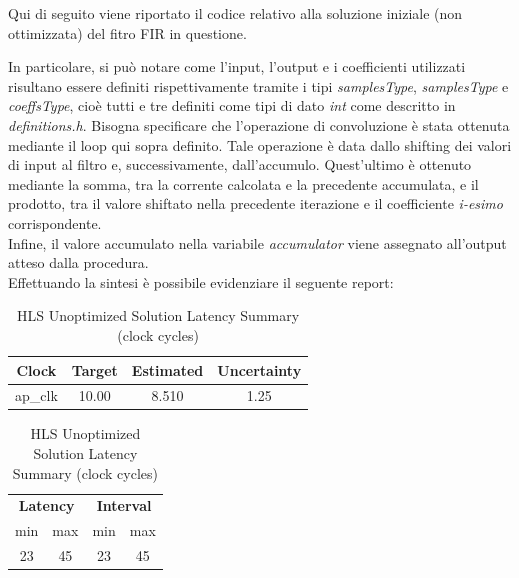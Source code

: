 Qui di seguito viene riportato il codice relativo alla soluzione iniziale (non ottimizzata) del fitro FIR in questione.



In particolare, si può notare come l'input, l'output e i coefficienti utilizzati risultano essere definiti rispettivamente tramite i tipi \textit{samplesType}, \textit{samplesType} e \textit{coeffsType}, cioè tutti e tre definiti come tipi di dato \textit{int} come descritto in \textit{definitions.h}. 
Bisogna specificare che l'operazione di convoluzione è stata ottenuta mediante il loop qui sopra definito. Tale operazione è data dallo shifting dei valori di input al filtro e, successivamente, dall'accumulo. Quest'ultimo è ottenuto mediante la somma, tra la corrente calcolata e la precedente accumulata, e il prodotto, tra il valore shiftato nella precedente iterazione e il coefficiente \textit{i-esimo} corrispondente.\\
Infine, il valore accumulato nella variabile \textit{accumulator} viene assegnato all'output atteso dalla procedura.\\
Effettuando la sintesi è possibile evidenziare il seguente report:\\

\begin{table}[H]
    \centering
    \begin{minipage}[t]{0.45\linewidth}
        \centering
        \begin{tabular}{|c|c|c|c|}
            \hline
            \textbf{Clock} & \textbf{Target} & \textbf{Estimated} & \textbf{Uncertainty} \\
            \hline
            ap\_clk & 10.00 & 8.510 & 1.25 \\
            \hline
        \end{tabular}
        \caption{HLS Unoptimized Solution Timing Summary (ns)}
        \label{tab:hls-unoptimized-solution-timing-summary}
    \end{minipage}
    \hfill
    \begin{minipage}[t]{0.45\linewidth}
        \centering
        \begin{tabular}{|c|c|c|c|}
            \hline
            \multicolumn{2}{|c|}{\textbf{Latency}} & \multicolumn{2}{|c|}{\textbf{Interval}} \\
            min & max & min & max \\
            \hline
            23 & 45 & 23 & 45 \\
            \hline
        \end{tabular}
        \caption{HLS Unoptimized Solution Latency Summary (clock cycles)}
        \label{tab:hls-unoptimized-solution-latency-summary}
    \end{minipage}
\end{table}

